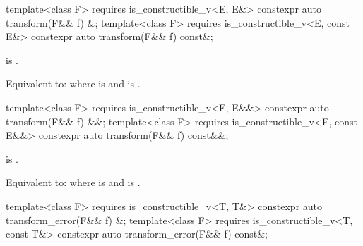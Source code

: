 %
\begin{itemdecl}
template<class F>
  requires is_constructible_v<E, E&>
constexpr auto transform(F&& f) &;
template<class F>
  requires is_constructible_v<E, const E&>
constexpr auto transform(F&& f) const&;
\end{itemdecl}

\begin{itemdescr}
\pnum
\constraints
{} is .

\pnum
\effects
Equivalent to:  where  is  and  is .
\end{itemdescr}

%
\begin{itemdecl}
template<class F>
  requires is_constructible_v<E, E&&>
constexpr auto transform(F&& f) &&;
template<class F>
  requires is_constructible_v<E, const E&&>
constexpr auto transform(F&& f) const&&;
\end{itemdecl}

\begin{itemdescr}
\pnum
\constraints
{} is .

\pnum
\effects
Equivalent to:  where  is  and  is .
\end{itemdescr}

%
\begin{itemdecl}
template<class F>
  requires is_constructible_v<T, T&>
constexpr auto transform_error(F&& f) &;
template<class F>
  requires is_constructible_v<T, const T&>
constexpr auto transform_error(F&& f) const&;
\end{itemdecl}

